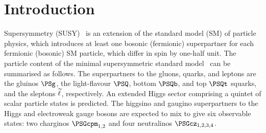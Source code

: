 \maketitle


\section{Introduction}
\label{sec:introduction}

Supersymmetry (SUSY)~\cite{ref:SUSY-1, ref:SUSY0, ref:SUSY3,
  ref:SUSY1} is an extension of the standard model (SM) of particle
physics, which introduces at least one bosonic (fermionic)
superpartner for each fermionic (bosonic) SM particle, which differ in
spin by one-half unit. The particle content of the minimal
supersymmetric standard model~\cite{ref:SUSY2} can be summarised as
follows. The superpartners to the gluons, quarks, and leptons are the
gluinos $\PSg$, the light-flavour $\PSQ$, bottom $\PSQb$, and top
$\PSQt$ squarks, and the sleptons $\widetilde{\ell}$, respectively. An extended
Higgs sector comprising a quintet of scalar particle states is
predicted. The higgsino and gaugino superpartners to the Higgs and
electroweak gauge bosons are expected to mix to give six observable
states: two charginos $\PSGcpm_{1,2}$ and four neutralinos
$\PSGcz_{1,2,3,4}$. 

